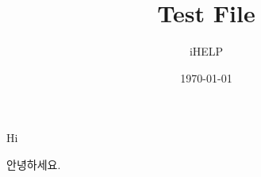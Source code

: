 \documentclass[a4paper,10pt]{report}
\title{Test File}
\author{iHELP}
\date{\today}
\begin{document}
\maketitle
Hi

안녕하세요. 
\end{document}
